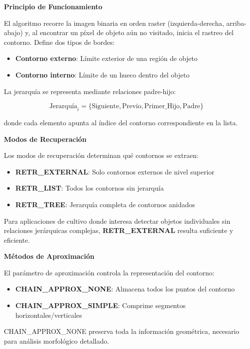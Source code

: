 \textbf{Principio de Funcionamiento}

El algoritmo recorre la imagen binaria en orden raster (izquierda-derecha, arriba-abajo) y, al encontrar un píxel de objeto aún no visitado, inicia el rastreo del contorno. Define dos tipos de bordes:

\begin{itemize}
\item \textbf{Contorno externo}: Límite exterior de una región de objeto
\item \textbf{Contorno interno}: Límite de un hueco dentro del objeto
\end{itemize}

La jerarquía se representa mediante relaciones padre-hijo:

\begin{equation}
\text{Jerarquía}_i = \{\text{Siguiente}, \text{Previo}, \text{Primer\_Hijo}, \text{Padre}\}
\end{equation}

donde cada elemento apunta al índice del contorno correspondiente en la lista.

\textbf{Modos de Recuperación}

Los modos de recuperación determinan qué contornos se extraen:

\begin{itemize}
\item \textbf{RETR\_EXTERNAL}: Solo contornos externos de nivel superior
\item \textbf{RETR\_LIST}: Todos los contornos sin jerarquía
\item \textbf{RETR\_TREE}: Jerarquía completa de contornos anidados
\end{itemize}

Para aplicaciones de cultivo donde interesa detectar objetos individuales sin relaciones jerárquicas complejas, \textbf{RETR\_EXTERNAL} resulta suficiente y eficiente.

\textbf{Métodos de Aproximación}

El parámetro de aproximación controla la representación del contorno:

\begin{itemize}
\item \textbf{CHAIN\_APPROX\_NONE}: Almacena todos los puntos del contorno
\item \textbf{CHAIN\_APPROX\_SIMPLE}: Comprime segmentos horizontales/verticales
\end{itemize}

CHAIN\_APPROX\_NONE preserva toda la información geométrica, necesario para análisis morfológico detallado.

